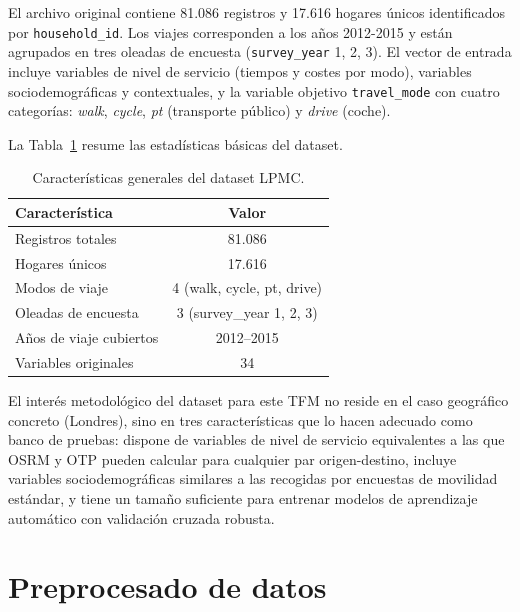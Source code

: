 El archivo original contiene 81.086 registros y 17.616 hogares únicos identificados por \texttt{household\_id}. Los viajes corresponden a los años 2012-2015 y están agrupados en tres oleadas de encuesta (\texttt{survey\_year} 1, 2, 3). El vector de entrada incluye variables de nivel de servicio (tiempos y costes por modo), variables sociodemográficas y contextuales, y la variable objetivo \texttt{travel\_mode} con cuatro categorías: \textit{walk}, \textit{cycle}, \textit{pt} (transporte público) y \textit{drive} (coche).

La Tabla~\ref{tab:lpmc_dataset_stats} resume las estadísticas básicas del dataset.

\begin{table}[htbp]
  \caption{Características generales del dataset LPMC.}
  \label{tab:lpmc_dataset_stats}
  \centering
  \begin{tabular}{lc}
    \toprule
    \textbf{Característica} & \textbf{Valor} \\
    \midrule
    Registros totales        & 81.086 \\
    Hogares únicos           & 17.616 \\
    Modos de viaje           & 4 (walk, cycle, pt, drive) \\
    Oleadas de encuesta      & 3 (survey\_year 1, 2, 3) \\
    Años de viaje cubiertos  & 2012--2015 \\
    Variables originales     & 34 \\
    \bottomrule
  \end{tabular}
\end{table}

El interés metodológico del dataset para este TFM no reside en el caso geográfico concreto (Londres), sino en tres características que lo hacen adecuado como banco de pruebas: dispone de variables de nivel de servicio equivalentes a las que OSRM y OTP pueden calcular para cualquier par origen-destino, incluye variables sociodemográficas similares a las recogidas por encuestas de movilidad estándar, y tiene un tamaño suficiente para entrenar modelos de aprendizaje automático con validación cruzada robusta.

\section{Preprocesado de datos}
\label{sec:impl_preprocesado}


